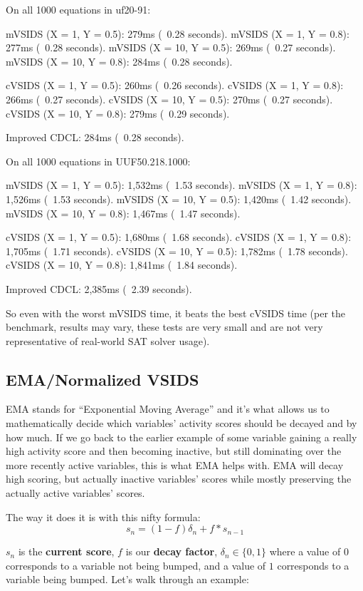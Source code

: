 \documentclass[../main.tex]{subfiles}
\begin{document}
\begin{FVerbatim}
On all 1000 equations in uf20-91:

mVSIDS (X = 1, Y = 0.5):    279ms (~0.28 seconds).
mVSIDS (X = 1, Y = 0.8):    277ms (~0.28 seconds).
mVSIDS (X = 10, Y = 0.5):   269ms (~0.27 seconds).
mVSIDS (X = 10, Y = 0.8):   284ms (~0.28 seconds).

cVSIDS (X = 1, Y = 0.5):    260ms (~0.26 seconds).
cVSIDS (X = 1, Y = 0.8):    266ms (~0.27 seconds).
cVSIDS (X = 10, Y = 0.5):   270ms (~0.27 seconds).
cVSIDS (X = 10, Y = 0.8):   279ms (~0.29 seconds).

Improved CDCL:              284ms (~0.28 seconds).

On all 1000 equations in UUF50.218.1000:

mVSIDS (X = 1, Y = 0.5):    1,532ms (~1.53 seconds).
mVSIDS (X = 1, Y = 0.8):    1,526ms (~1.53 seconds).
mVSIDS (X = 10, Y = 0.5):   1,420ms (~1.42 seconds).
mVSIDS (X = 10, Y = 0.8):   1,467ms (~1.47 seconds).

cVSIDS (X = 1, Y = 0.5):    1,680ms (~1.68 seconds).
cVSIDS (X = 1, Y = 0.8):    1,705ms (~1.71 seconds).
cVSIDS (X = 10, Y = 0.5):   1,782ms (~1.78 seconds).
cVSIDS (X = 10, Y = 0.8):   1,841ms (~1.84 seconds).

Improved CDCL:              2,385ms (~2.39 seconds).
\end{FVerbatim}
\noindent
So even with the worst mVSIDS time, it beats the best cVSIDS time
(per the benchmark, results may vary, these tests are very small and are not 
very representative of real-world SAT solver usage).

\subsection{EMA/Normalized VSIDS}

EMA stands for ``Exponential Moving Average'' and it's what allows us to 
mathematically decide which variables' activity scores should be decayed 
and by how much. If we go back to the earlier example of some variable gaining 
a really high activity score and then becoming inactive, but still dominating 
over the more recently active variables, this is what EMA helps with. EMA will 
decay high scoring, but actually inactive variables' scores while mostly 
preserving the actually active variables' scores. 

The way it does it is with this nifty formula:
$$s_n = (1 - f)\delta_n + f * s_{n - 1}$$

$s_n$ is the \textbf{current score}, $f$ is our \textbf{decay factor},
$\delta_n \in \{0, 1\}$ where a value of $0$ corresponds to a variable 
not being bumped, and a value of $1$ corresponds to a variable being bumped.
Let's walk through an example:
\end{document}

